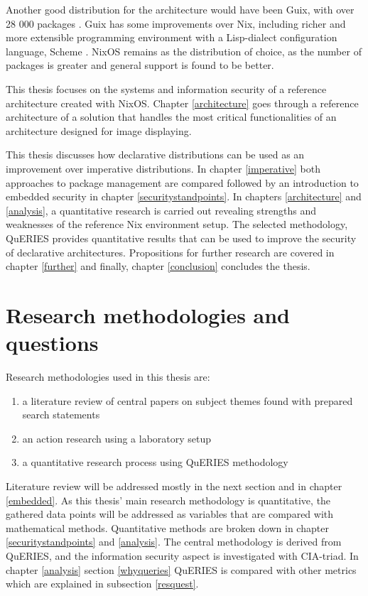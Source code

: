 Another good distribution for the architecture would have been Guix, with over
28 000 packages \cite{gnuPackagesx2014}. Guix has some improvements
over Nix, including richer and more extensible programming environment
with a Lisp-dialect configuration language, Scheme
\cite{courtes2021deploiements}. NixOS remains as the distribution of
choice, as the number of packages is greater and general support is
found to be better.

This thesis focuses on the systems and information security of a
reference architecture created with NixOS. Chapter \ref{architecture}
goes through a reference architecture of a solution that handles the
most critical functionalities of an architecture designed for image displaying.

This thesis discusses how declarative distributions can be used as an
improvement over imperative distributions. In chapter \ref{imperative} both approaches to package
management are compared followed by an introduction to
embedded security in chapter \ref{securitystandpoints}. In chapters
\ref{architecture} and \ref{analysis}, a quantitative research is
carried out revealing strengths and weaknesses of the reference Nix
environment setup. The selected methodology, QuERIES provides
quantitative results that can be used to improve the security of
declarative architectures. Propositions for further research are
covered in chapter \ref{further} and finally, chapter
\ref{conclusion} concludes the thesis.

\section{Research methodologies and questions}

Research methodologies used in this thesis are:
\begin{enumerate}
\item a literature review of central papers on subject themes found
  with prepared search statements
\item an action research using a laboratory setup
\item a quantitative research process using QuERIES methodology
\end{enumerate}

Literature review will be addressed mostly in the next section and in
chapter \ref{embedded}. As this thesis' main research methodology is
quantitative, the gathered data points will be addressed as variables
that are compared with mathematical methods. Quantitative methods are
broken down in chapter \ref{securitystandpoints} and
\ref{analysis}. The central methodology is derived from QuERIES, and
the information security aspect is investigated with CIA-triad. In
chapter \ref{analysis} section \ref{whyqueries} QuERIES is compared
with other metrics which are explained in subsection \ref{resquest}.

